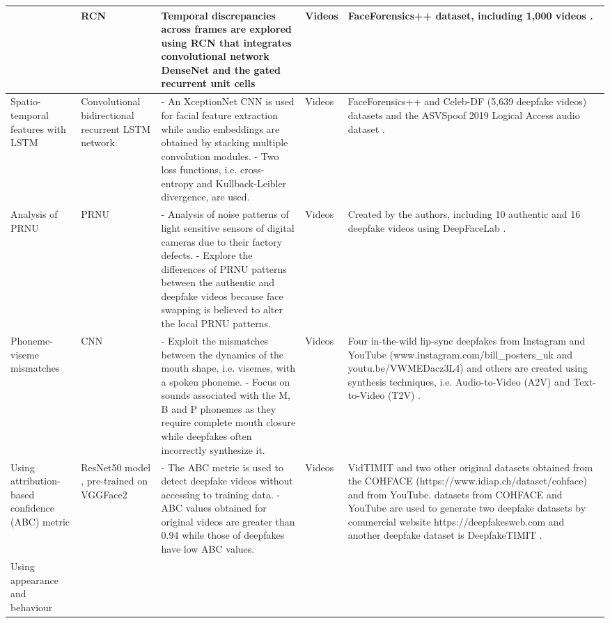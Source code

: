\begin{table}[h!]
\begin{scriptsize}
\begin{tabularx}{\linewidth}{p{} p{} p{} p{} p{}}
&RCN
&Temporal discrepancies across frames are explored using RCN that integrates convolutional network DenseNet  and the gated recurrent unit cells 
&Videos
&FaceForensics++ dataset, including 1,000 videos .\\
\hline
Spatio-temporal features with LSTM 
& Convolutional bidirectional recurrent LSTM network
& - An XceptionNet CNN is used for facial feature extraction while audio embeddings are obtained by stacking multiple convolution modules.\newline
- Two loss functions, i.e. cross-entropy and Kullback-Leibler divergence, are used.
& Videos
& FaceForensics++  and Celeb-DF (5,639 deepfake videos)  datasets and the ASVSpoof 2019 Logical Access audio dataset .\\
\hline
Analysis of PRNU 
&PRNU
&- Analysis of noise patterns of light sensitive sensors of digital cameras due to their factory defects.\newline
- Explore the differences of PRNU patterns between the authentic and deepfake videos because face swapping is believed to alter the local PRNU patterns.
&Videos	
&Created by the authors, including 10 authentic and 16 deepfake videos using DeepFaceLab .\\
\hline
Phoneme-viseme mismatches 
& CNN
& - Exploit the mismatches between the dynamics of the mouth shape, i.e. visemes, with a spoken phoneme.\newline
- Focus on sounds associated with the M, B and P phonemes as they require complete mouth closure while deepfakes often incorrectly synthesize it.
& Videos
& Four in-the-wild lip-sync deepfakes from Instagram and YouTube (www.instagram.com/bill\_posters\_uk and youtu.be/VWMEDacz3L4) and others are created using synthesis techniques, i.e. Audio-to-Video (A2V)  and Text-to-Video (T2V) .\\
\hline
Using attribution-based confidence (ABC) metric 
& ResNet50 model , pre-trained on VGGFace2 
& - The ABC metric  is used to detect deepfake videos without accessing to training data.\newline
- ABC values obtained for original videos are greater than 0.94 while those of deepfakes have low ABC values.
& Videos
& VidTIMIT and two other original datasets obtained from the COHFACE (https://www.idiap.ch/dataset/cohface) and from YouTube. datasets from COHFACE  and YouTube are used to generate two deepfake datasets by commercial website https://deepfakesweb.com and another deepfake dataset is DeepfakeTIMIT .\\
\hline
Using appearance and behaviour 

\end{tabularx}
\end{scriptsize}
\end{table}
